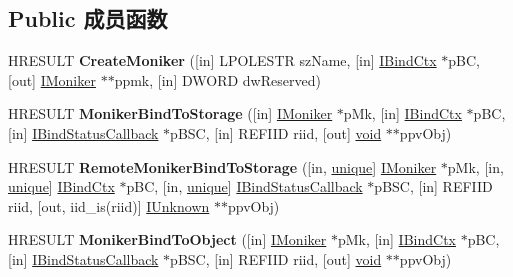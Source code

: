 \subsection*{Public 成员函数}
\begin{DoxyCompactItemize}
\item 
\mbox{\label{interface_i_bind_host_ae2629205d085e2fd7e059f006ff6a6fe}} 
H\+R\+E\+S\+U\+LT {\bfseries Create\+Moniker} (\mbox{[}in\mbox{]} L\+P\+O\+L\+E\+S\+TR sz\+Name, \mbox{[}in\mbox{]} \hyperlink{interface_i_bind_ctx}{I\+Bind\+Ctx} $\ast$p\+BC, \mbox{[}out\mbox{]} \hyperlink{interface_i_moniker}{I\+Moniker} $\ast$$\ast$ppmk, \mbox{[}in\mbox{]} D\+W\+O\+RD dw\+Reserved)
\item 
\mbox{\label{interface_i_bind_host_afaadb5b8426e561365c802205b0614aa}} 
H\+R\+E\+S\+U\+LT {\bfseries Moniker\+Bind\+To\+Storage} (\mbox{[}in\mbox{]} \hyperlink{interface_i_moniker}{I\+Moniker} $\ast$p\+Mk, \mbox{[}in\mbox{]} \hyperlink{interface_i_bind_ctx}{I\+Bind\+Ctx} $\ast$p\+BC, \mbox{[}in\mbox{]} \hyperlink{interface_i_bind_status_callback}{I\+Bind\+Status\+Callback} $\ast$p\+B\+SC, \mbox{[}in\mbox{]} R\+E\+F\+I\+ID riid, \mbox{[}out\mbox{]} \hyperlink{interfacevoid}{void} $\ast$$\ast$ppv\+Obj)
\item 
\mbox{\label{interface_i_bind_host_aa5deb4c560bbfb8df7c6a10f6f415340}} 
H\+R\+E\+S\+U\+LT {\bfseries Remote\+Moniker\+Bind\+To\+Storage} (\mbox{[}in, \hyperlink{interfaceunique}{unique}\mbox{]} \hyperlink{interface_i_moniker}{I\+Moniker} $\ast$p\+Mk, \mbox{[}in, \hyperlink{interfaceunique}{unique}\mbox{]} \hyperlink{interface_i_bind_ctx}{I\+Bind\+Ctx} $\ast$p\+BC, \mbox{[}in, \hyperlink{interfaceunique}{unique}\mbox{]} \hyperlink{interface_i_bind_status_callback}{I\+Bind\+Status\+Callback} $\ast$p\+B\+SC, \mbox{[}in\mbox{]} R\+E\+F\+I\+ID riid, \mbox{[}out, iid\+\_\+is(riid)\mbox{]} \hyperlink{interface_i_unknown}{I\+Unknown} $\ast$$\ast$ppv\+Obj)
\item 
\mbox{\label{interface_i_bind_host_ab8e70c8ab917614c2ea3deb7ae7b0a2c}} 
H\+R\+E\+S\+U\+LT {\bfseries Moniker\+Bind\+To\+Object} (\mbox{[}in\mbox{]} \hyperlink{interface_i_moniker}{I\+Moniker} $\ast$p\+Mk, \mbox{[}in\mbox{]} \hyperlink{interface_i_bind_ctx}{I\+Bind\+Ctx} $\ast$p\+BC, \mbox{[}in\mbox{]} \hyperlink{interface_i_bind_status_callback}{I\+Bind\+Status\+Callback} $\ast$p\+B\+SC, \mbox{[}in\mbox{]} R\+E\+F\+I\+ID riid, \mbox{[}out\mbox{]} \hyperlink{interfacevoid}{void} $\ast$$\ast$ppv\+Obj)

\end{DoxyCompactItemize}

